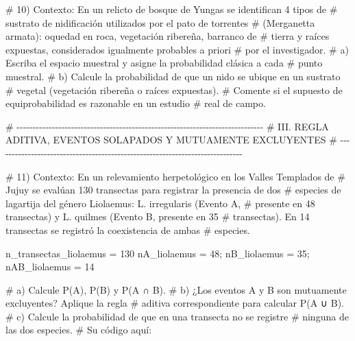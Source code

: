 \documentclass[
  spanish,
  letterpaper,
  DIV=11,
  numbers=noendperiod]{scrreprt}
\newenvironment{Shaded}{\begin{snugshade}}{\end{snugshade}}
\newcommand{\CommentTok}[1]{\textcolor[rgb]{0.37,0.37,0.37}{#1}}
\newcommand{\DecValTok}[1]{\textcolor[rgb]{0.68,0.00,0.00}{#1}}
\newcommand{\NormalTok}[1]{\textcolor[rgb]{0.00,0.23,0.31}{#1}}
\newcommand{\OtherTok}[1]{\textcolor[rgb]{0.00,0.23,0.31}{#1}}
\begin{document}
\begin{Shaded}
\begin{Highlighting}[]
\CommentTok{\# 10) Contexto: En un relicto de bosque de Yungas se identifican 4 tipos de}
\CommentTok{\#     sustrato de nidificación utilizados por el pato de torrentes}
\CommentTok{\#     (Merganetta armata): oquedad en roca, vegetación ribereña, barranco de}
\CommentTok{\#     tierra y raíces expuestas, considerados igualmente probables a priori}
\CommentTok{\#     por el investigador.}
\CommentTok{\#     a) Escriba el espacio muestral y asigne la probabilidad clásica a cada}
\CommentTok{\#        punto muestral.}
\CommentTok{\#     b) Calcule la probabilidad de que un nido se ubique en un sustrato}
\CommentTok{\#        vegetal (vegetación ribereña o raíces expuestas).}
\CommentTok{\#     Comente si el supuesto de equiprobabilidad es razonable en un estudio}
\CommentTok{\#     real de campo.}


\CommentTok{\# {-}{-}{-}{-}{-}{-}{-}{-}{-}{-}{-}{-}{-}{-}{-}{-}{-}{-}{-}{-}{-}{-}{-}{-}{-}{-}{-}{-}{-}{-}{-}{-}{-}{-}{-}{-}{-}{-}{-}{-}{-}{-}{-}{-}{-}{-}{-}{-}{-}{-}{-}{-}{-}{-}{-}{-}{-}{-}{-}{-}{-}{-}{-}{-}{-}{-}{-}{-}{-}{-}{-}{-}{-}{-}{-}{-}{-}}
\CommentTok{\# III. REGLA ADITIVA, EVENTOS SOLAPADOS Y MUTUAMENTE EXCLUYENTES}
\CommentTok{\# {-}{-}{-}{-}{-}{-}{-}{-}{-}{-}{-}{-}{-}{-}{-}{-}{-}{-}{-}{-}{-}{-}{-}{-}{-}{-}{-}{-}{-}{-}{-}{-}{-}{-}{-}{-}{-}{-}{-}{-}{-}{-}{-}{-}{-}{-}{-}{-}{-}{-}{-}{-}{-}{-}{-}{-}{-}{-}{-}{-}{-}{-}{-}{-}{-}{-}{-}{-}{-}{-}{-}{-}{-}{-}{-}{-}{-}}

\CommentTok{\# 11) Contexto: En un relevamiento herpetológico en los Valles Templados de}
\CommentTok{\#     Jujuy se evalúan 130 transectas para registrar la presencia de dos}
\CommentTok{\#     especies de lagartija del género Liolaemus: L. irregularis (Evento A,}
\CommentTok{\#     presente en 48 transectas) y L. quilmes (Evento B, presente en 35}
\CommentTok{\#     transectas). En 14 transectas se registró la coexistencia de ambas}
\CommentTok{\#     especies.}

\NormalTok{n\_transectas\_liolaemus }\OtherTok{=} \DecValTok{130}
\NormalTok{nA\_liolaemus }\OtherTok{=} \DecValTok{48}\NormalTok{; nB\_liolaemus }\OtherTok{=} \DecValTok{35}\NormalTok{; nAB\_liolaemus }\OtherTok{=} \DecValTok{14}

\CommentTok{\#     a) Calcule P(A), P(B) y P(A ∩ B).}
\CommentTok{\#     b) ¿Los eventos A y B son mutuamente excluyentes? Aplique la regla}
\CommentTok{\#        aditiva correspondiente para calcular P(A ∪ B).}
\CommentTok{\#     c) Calcule la probabilidad de que en una transecta no se registre}
\CommentTok{\#        ninguna de las dos especies.}
\CommentTok{\# Su código aquí:}



\end{Highlighting}
\end{Shaded}
\end{document}
